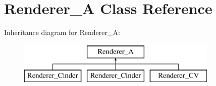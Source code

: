 \hypertarget{class_renderer___a}{\section{Renderer\-\_\-\-A Class Reference}
\label{class_renderer___a}
}
Inheritance diagram for Renderer\-\_\-\-A\-:\begin{figure}[H]
\begin{center}
\leavevmode
\includegraphics[height=2.000000cm]{class_renderer___a}
\end{center}
\end{figure}
